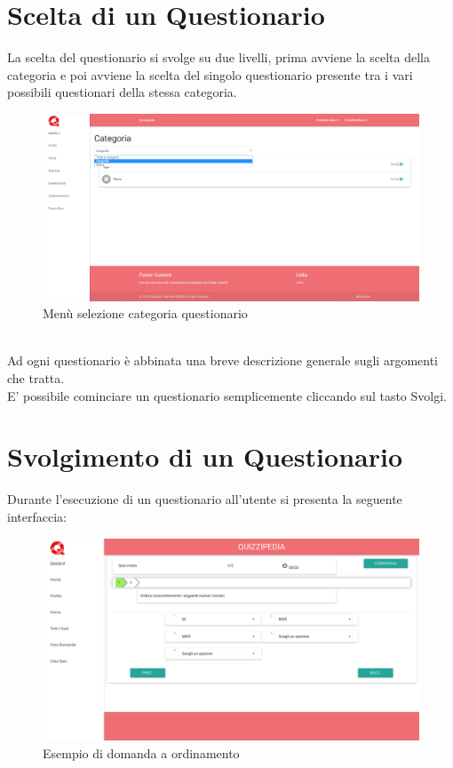 \documentclass[a4paper,11pt]{article}
\begin{document}
	\section{Scelta di un Questionario}
	La scelta del questionario si svolge su due livelli, prima avviene la scelta della categoria e poi avviene la scelta del singolo questionario presente tra i vari possibili questionari della stessa categoria.
	\begin{figure}[h!]
	\begin{center}
	\includegraphics[scale=0.5]{../images/screen_category.png}
	\caption{Menù selezione categoria questionario}
	\end{center}
	\end{figure}
	\\
	Ad ogni questionario è abbinata una breve descrizione generale sugli argomenti che tratta.\\ E' possibile cominciare un questionario semplicemente cliccando sul tasto Svolgi.
	\newpage
	\section{Svolgimento di un Questionario}
	Durante l'esecuzione di un questionario  all'utente si presenta la seguente interfaccia:\\
	\begin{figure}[h!]
	\begin{center}
	\includegraphics[scale=0.3]{../images/quizCompilation1.png}
	\caption{Esempio di domanda a ordinamento}
	\end{center}
	\end{figure}
	\\
	
\end{document}
